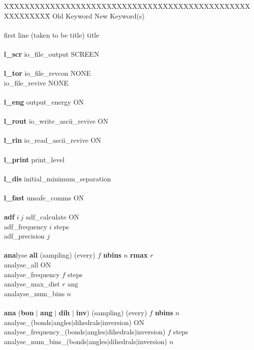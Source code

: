 \begin{tabbing}
X\=XXXXXXXXXXXXXXXXXXXX\=XXXXXXXXXXXXXXXXXXXXXXXXXXXXXXXXXXXX\=\kill
\>    Old Keyword \> New Keyword(s) \\\\
\>    first line (taken to be title) \> title \\\\
\>    {\bf l\_scr} \> io\_file\_output SCREEN \\\\
\>    {\bf l\_tor} \> io\_file\_revcon NONE \\
\> \> io\_file\_revive NONE \\\\
\>    {\bf l\_eng} \> output\_energy ON \\\\
\>    {\bf l\_rout} \> io\_write\_ascii\_revive ON \\\\
\>    {\bf l\_rin} \> io\_read\_ascii\_revive ON \\\\
\>    {\bf l\_print} \> print\_level \\\\
\>    {\bf l\_dis} \> initial\_minimum\_separation \\\\
\>    {\bf l\_fast} \> unsafe\_comms ON  \\\\
\>    {\bf adf} $i~j$ \> adf\_calculate ON \\
\> \> adf\_frequency $i$ steps \\
\> \> adf\_precision $j$ \\    \\
\>    {\bf ana}lyse {\bf all} (sampling) (every) $f$ {\bf nbins} $n$ {\bf rmax} $r$ \\
\> \> analyse\_all ON \\
\> \> analyse\_frequency $f$ steps \\
\> \> analyse\_max\_dist $r$ ang \\
\> \> analayse\_num\_bins $n$ \\\\
\>    {\bf ana} ({\bf bon} $|$ {\bf ang} $|$ {\bf dih} $|$ {\bf inv})  (sampling) (every) $f$ {\bf nbins} $n$ \\
\> \> analyse\_(bonds$|$angles$|$dihedrals$|$inversion) ON \\
\> \> analyse\_frequency\_(bonds$|$angles$|$dihedrals$|$inversion) $f$ steps \\
\> \> analyse\_num\_bins\_(bonds$|$angles$|$dihedrals$|$inversion) $n$ \\\\

\end{tabbing}
